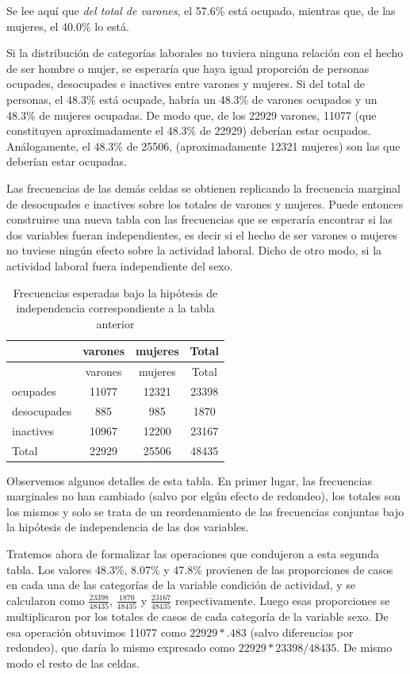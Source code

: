 \documentclass[]{book}
\begin{document}
Se lee aquí que \emph{del total de varones}, el 57.6\% está ocupado, mientras que, de las mujeres, el 40.0\% lo está.

Si la distribución de categorías laborales no tuviera ninguna relación con el hecho de ser hombre o mujer, se esperaría que haya igual proporción de personas ocupades, desocupades e inactives entre varones y mujeres. Si del total de personas, el 48.3\% está ocupade, habría un 48.3\% de varones ocupados y un 48.3\% de mujeres ocupadas. De modo que, de los 22929 varones, 11077 (que constituyen aproximadamente el 48.3\% de 22929) deberían estar ocupados. Análogamente, el 48.3\% de 25506,
(aproximadamente 12321 mujeres) son las que deberían estar ocupadas.

Las frecuencias de las demás celdas se obtienen replicando la frecuencia marginal de desocupades e inactives sobre los totales de varones y mujeres. Puede entonces construirse una nueva tabla con las frecuencias que se esperaría encontrar si las dos variables fueran independientes, es decir si el hecho de ser varones o mujeres no tuviese ningún efecto sobre la actividad laboral. Dicho de otro modo, si la actividad laboral fuera independiente del sexo.

\begin{longtable}[]{@{}lccc@{}}
\caption{\label{tab:unnamed-chunk-123}Frecuencias esperadas bajo la hipótesis de independencia
correspondiente a la tabla anterior}\tabularnewline
\toprule
& varones & mujeres & Total\tabularnewline
\midrule
\endfirsthead
\toprule
& varones & mujeres & Total\tabularnewline
\midrule
\endhead
ocupades & 11077 & 12321 & 23398\tabularnewline
desocupades & 885 & 985 & 1870\tabularnewline
inactives & 10967 & 12200 & 23167\tabularnewline
Total & 22929 & 25506 & 48435\tabularnewline
\bottomrule
\end{longtable}

Observemos algunos detalles de esta tabla. En primer lugar, las frecuencias marginales no han cambiado (salvo por elgún efecto de redondeo), los totales son los mismos y solo se trata de un reordenamiento de las frecuencias conjuntas bajo la hipótesis de independencia de las dos variables.

Tratemos ahora de formalizar las operaciones que condujeron a esta segunda tabla. Los valores 48.3\%, 8.07\% y 47.8\% provienen de las proporciones de casos en cada una de las categorías de la variable condición de actividad, y se calcularon como \(\frac{23398}{48435}\), \(\frac{1870}{48435}\) y \(\frac{23167}{48435}\) respectivamente. Luego esas proporciones se multiplicaron por los totales de casos de cada categoría de la variable sexo. De esa operación obtuvimos 11077 como \(22929*.483\) (salvo diferencias por redondeo), que daría lo mismo expresado como \(22929*23398/48435\). De mismo modo el resto de las celdas.
\end{document}
